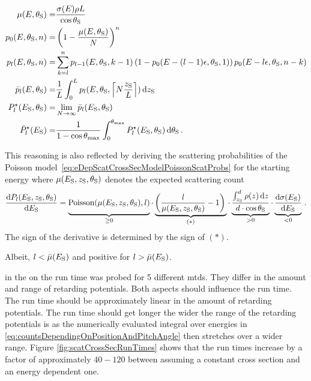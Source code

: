 \begin{subequations}
	\label{eq:energydepScatProbsModel}
	\begin{align}
	\mu(E,\theta_\mathrm{S}) =&
	\frac{\sigma(E)\rho L}{\cos\theta_\mathrm{S}} \\
	p_0(E,\theta_\mathrm{S},n) =&
	\left(
	1-\frac{\mu(E,\theta_\mathrm{S})}{N}
	\right)^n \\
	p_l(E,\theta_\mathrm{S},n) =&
	\sum_{k=l}^{n}
	p_{l-1}(E,\theta_\mathrm{S},k-1)
	\left(
	1-p_0(E-(l-1)\epsilon,\theta_\mathrm{S},1)
	\right)
	p_0(E-l\epsilon,\theta_\mathrm{S},n-k) \\
	\bar{p}_l(E,\theta_\mathrm{S}) =& 
	\frac{1}{L}
	\int_{0}^{L}
	p_l(E,\theta_\mathrm{S},
	\left\lceil N \frac{z_\mathrm{S}}{L}\right\rceil
	)
	\mathop{}\!\mathrm{d} z_\mathrm{S} 
	\label{eq:energydepScatProbsZAverage} \\
	P^{\star}_l(E_\mathrm{S},\theta_\mathrm{S}) =& 
	\lim_{N\rightarrow\infty} \bar{p}_l(E_\mathrm{S},\theta_\mathrm{S}) 
	\label{eq:energydepScatProbsLimit} \\ 
	\bar{P}^{\star}_l(E_\mathrm{S}) =& 
	\frac{1}{1-\cos\theta_\mathrm{max}}
	\int_0^{\theta_\mathrm{max}}
	P^{\star}_l(E_\mathrm{S},\theta_\mathrm{S}) 
	\mathop{}\!\mathrm{d} \theta_\mathrm{S}
	\label{eq:energydepScatProbs}
	\text{\,.}
	\end{align}
\end{subequations}


This reasoning is also reflected by deriving the scattering probabilities of the Poisson model~\eqref{eq:eDepScatCrossSecModelPoissonScatProbs} for the starting energy where $\mu(E_\mathrm{S},z_\mathrm{S},\theta_\mathrm{S})$ denotes the expected scattering count
\begin{equation}
\frac{\d P_l(\Esource,\zSource,\thetaSource)}
{\d \Esource} =
\underbrace{
	\mathrm{Poisson}(\mu(\Esource,\zSource,\thetaSource),l)
	\vphantom{\frac{\d \sigma(\Esource)}{\d \Esource}}
}_{\geq 0} \cdot
\underbrace{
	\left(
	\frac{l}{\mu(\Esource,\zSource,\thetaSource)} -1
	\right)
	\vphantom{\frac{\d \sigma(\Esource)}{\d \Esource}}
}_{(*)} \cdot
\underbrace{
	\frac{\int_{\zSource}^{d} \rho(z) \d z}
	{d \cdot \cos\thetaSource}
	\vphantom{\frac{\d \sigma(\Esource)}{\d \Esource}}
}_{>0} \cdot
\underbrace{
	\frac{\d \sigma(\Esource)}{\d \Esource}
}_{<0} \fullstop
\end{equation}
The sign of the derivative is determined by the sign of $(*)$. 


Albeit,  $l<\bar{\mu}(E_\mathrm{S})$ and positive for $l>\bar{\mu}(E_\mathrm{S})$.



in the on the run time was probed for 5 different \gls{mtd}s. They differ in the amount and range of retarding potentials. Both aspects should influence the run time. The run time should be approximately linear in the amount of retarding potentials. The run time should get longer the wider the range of the retarding potentials is as the numerically evaluated integral over energies in \eqref{eq:countsDependingOnPositionAndPitchAngle} then stretches over a wider range. Figure \ref{fig:scatCrossSecRunTimes} shows that the run times increase by a factor of approximately $40-120$ between assuming a constant cross section and an energy dependent one.


